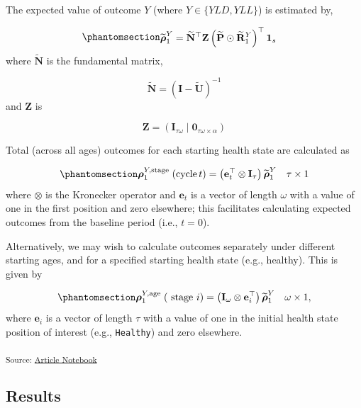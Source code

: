 \documentclass[
]{agujournal2019}
\begin{document}
The expected value of outcome \(Y\) (where \(Y \in \{YLD, YLL\}\)) is
estimated by,

\begin{equation}\phantomsection\label{eq-app3out}{
\begin{aligned}
& \widetilde{\boldsymbol{\rho}}^{Y}_{1}=\widetilde{\mathbf{N}}^{\top} \mathbf{Z}\left(\widetilde{\mathbf{P}} \odot \widetilde{\mathbf{R}}^Y_{1}\right)^{\top} \mathbf{1}_{s} 
\end{aligned}
}\end{equation} where \(\widetilde{\mathbf{N}}\) is the fundamental
matrix,

\[
\widetilde{\mathbf{N}}=(\mathbf{I}-\widetilde{\mathbf{U}})^{-1}
\] and \(\mathbf{Z}\) is

\[
\mathbf{Z}=\left(\mathbf{I}_{\tau \omega} \mid \mathbf{0}_{\tau \omega \times \alpha}\right)
\]

Total (across all ages) outcomes for each starting health state are
calculated as

\begin{equation}\phantomsection\label{eq-app3outstate}{
\boldsymbol{\rho}_{1}^{Y,\text {stage }}(\operatorname{cycle} t)=\left(\mathbf{e}_{t}^{\top} \otimes \mathbf{I}_{\tau}\right) \widetilde{\boldsymbol{\rho}}^Y_{1} \quad \tau \times 1
}\end{equation} where \(\otimes\) is the Kronecker operator and
\(\mathbf{e}_{t}\) is a vector of length \(\omega\) with a value of one
in the first position and zero elsewhere; this facilitates calculating
expected outcomes from the baseline period (i.e., \(t=0\)).

Alternatively, we may wish to calculate outcomes separately under
different starting ages, and for a specified starting health state
(e.g., healthy). This is given by

\begin{equation}\phantomsection\label{eq-app3outage}{
\boldsymbol{\rho}_{1}^{Y,\text {age }}(\text { stage } i)=\left(\mathbf{I}_{\omega} \otimes \mathbf{e}_{i}^{\top}\right) \widetilde{\boldsymbol{\rho}}^Y_{1} \quad \omega \times 1,
}\end{equation} where \(\mathbf{e}_{i}\) is a vector of length \(\tau\)
with a value of one in the initial health state position of interest
(e.g., \texttt{Healthy}) and zero elsewhere.

\textsubscript{Source:
\href{https://graveja0.github.io/dalys/index.qmd.html}{Article
Notebook}}

\subsection{Results}\label{sec-results}
\end{document}
